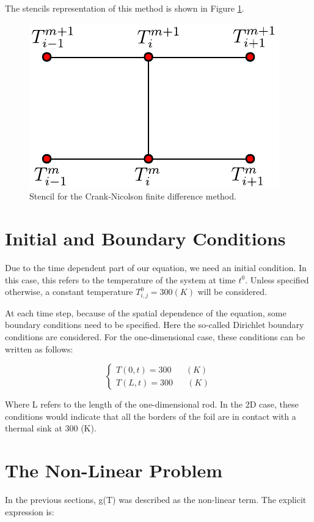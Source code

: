 The stencils representation of this method is shown in Figure \ref{fig:StencilCrNic}.

\begin{figure}[h]
    \centering
    \includegraphics[width=0.35\columnwidth]{Stencils_FiniteDifferences/CrkNic.pdf}
    \caption{Stencil for the Crank-Nicolson finite difference method.}
    \label{fig:StencilCrNic}
\end{figure}

\section{Initial and Boundary Conditions}

Due to the time dependent part of our equation, we need an initial condition. In this case, this refers to the temperature of the system at time $t^0$. Unless specified otherwise, a constant temperature $T_{i,j}^0 = 300 (K)$ will be considered.

At each time step, because of the spatial dependence of the equation, some boundary conditions need to be specified. Here the so-called Dirichlet boundary conditions are considered. For the one-dimensional case, these conditions can be written as follows: 

\begin{equation}
    \begin{cases}
      T(0,t) = 300 \mspace{30mu} (K) \\
      T(L,t) = 300 \mspace{30mu} (K) 
    \end{cases}
\end{equation}

Where L refers to the length of the one-dimensional rod. In the 2D case, these conditions would indicate that all the borders of the foil are in contact with a thermal sink at 300 (K). 

\section{The Non-Linear Problem}

In the previous sections, g(T) was described as the non-linear term. The explicit expression is: 

